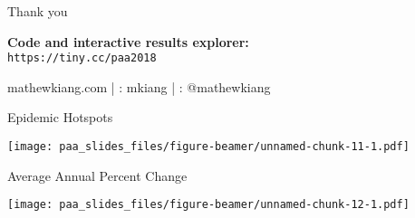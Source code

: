 \documentclass[ignorenonframetext,compress]{beamer}
\begin{document}
\begin{frame}{Thank you}

\Large

\begin{center}
\textbf{Code and interactive results explorer:} \\ \texttt{https://tiny.cc/paa2018} \newline \newline

 mathewkiang.com | \faGithub: mkiang | \faTwitter: @mathewkiang 

\end{center}

\end{frame}

\begin{frame}{Epidemic Hotspots}

\texttt{[image: paa\_slides\_files/figure-beamer/unnamed-chunk-11-1.pdf]}

\end{frame}

\begin{frame}{Average Annual Percent Change}

\texttt{[image: paa\_slides\_files/figure-beamer/unnamed-chunk-12-1.pdf]}

\end{frame}
\end{document}
